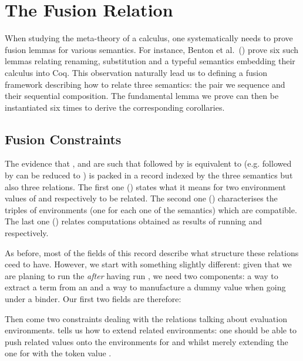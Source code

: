 \chapter{The Fusion Relation}
\label{sec:fusionrel}

When studying the meta-theory of a calculus, one systematically needs to prove
fusion lemmas for various semantics. For instance, Benton et al.~(\citeyear{benton2012strongly})
prove six such lemmas relating renaming, substitution and a typeful semantics
embedding their calculus into Coq. This observation naturally lead us to
defining a fusion framework describing how to relate three semantics: the pair
we sequence and their sequential composition. The fundamental lemma we prove
can then be instantiated six times to derive the corresponding corollaries.

\section{Fusion Constraints}

The evidence that ,  and  are such that  followed
by  is equivalent to  (e.g.  followed by 
can be reduced to ) is packed in a record  indexed by the
three semantics but also three relations. The first one () states what it means
for two environment values of  and  respectively to be related. The
second one () characterises the triples of environments (one for each one of
the semantics) which are compatible. The last one () relates computations
obtained as results of running  and  respectively.


As before, most of the fields of this record describe what structure these relations
ceed to have. However, we start with something slightly different: given that we are
planing to run the   \emph{after} having run , we need
two components: a way to extract a term from an  and a way to manufacture a
dummy  value when going under a binder. Our first two fields are therefore:


Then come two constraints dealing with the relations talking about evaluation environments.
 tells us how to extend related environments: one should be able to push related
values onto the environments for  and  whilst merely extending the one
for  with the token value .

